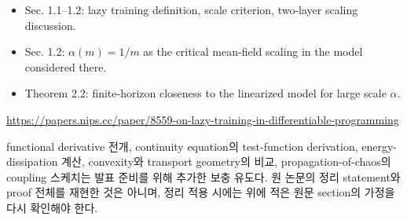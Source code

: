 \documentclass[11pt,a4paper,oneside,openany]{memoir}
\theoremstyle{definition}
\begin{document}
\begin{itemize}
  \item Sec. 1.1--1.2: lazy training definition, scale criterion, two-layer scaling discussion.
  \item Sec. 1.2: $\alpha(m)=1/m$ as the critical mean-field scaling in the model considered there.
  \item Theorem 2.2: finite-horizon closeness to the linearized model for large scale $\alpha$.
\end{itemize}
\url{https://papers.nips.cc/paper/8559-on-lazy-training-in-differentiable-programming}

\begin{warningbox}
functional derivative 전개, continuity equation의 test-function derivation, energy-dissipation 계산,
convexity와 transport geometry의 비교, propagation-of-chaos의 coupling 스케치는 발표 준비를 위해 추가한
보충 유도다. 원 논문의 정리 statement와 proof 전체를 재현한 것은 아니며, 정리 적용 시에는 위에 적은
원문 section의 가정을 다시 확인해야 한다.
\end{warningbox}
\end{document}
